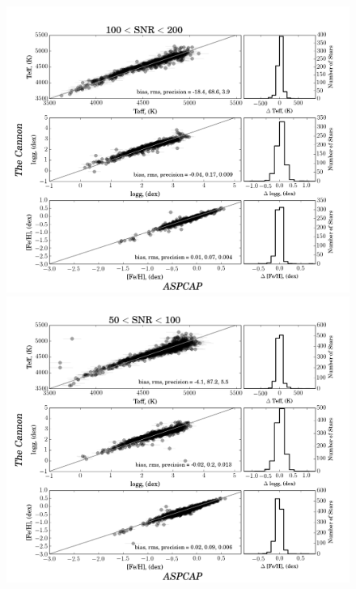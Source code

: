 \documentclass[12pt, preprint]{aastex}
\begin{document}
 \begin{figure}[!h]
 \centering
 \includegraphics[scale=0.25]{./plots/SNR100to200.png}
\includegraphics[scale=0.25]{./plots/SNR50to100.png}\\

\end{figure}
\end{document}
